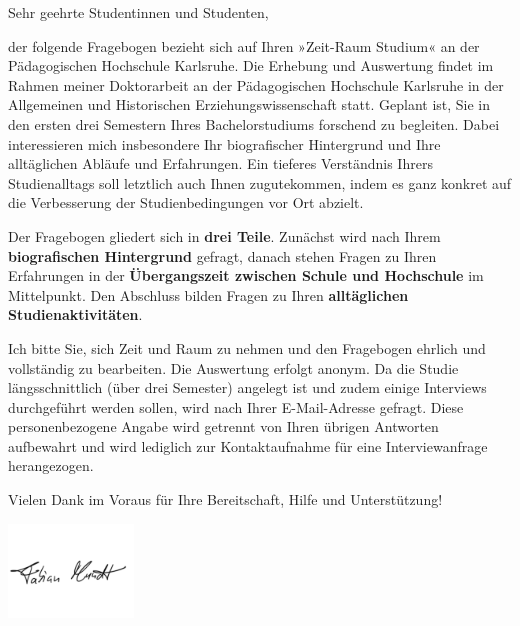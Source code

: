 

\begin{info}
\vspace{.5cm}

Sehr geehrte Studentinnen und Studenten,

\vspace{.5em}

der folgende Fragebogen bezieht sich auf Ihren »Zeit-Raum Studium« an der Pädagogischen Hochschule Karlsruhe. Die Erhebung und Auswertung findet im Rahmen meiner Doktorarbeit an der Pädagogischen Hochschule Karlsruhe in der Allgemeinen und Historischen Erziehungswissenschaft statt. Geplant ist, Sie in den ersten drei Semestern Ihres Bachelorstudiums forschend zu begleiten. Dabei interessieren mich insbesondere Ihr biografischer Hintergrund und Ihre alltäglichen Abläufe und Erfahrungen. Ein tieferes Verständnis Ihrers Studienalltags soll letztlich auch Ihnen zugutekommen, indem es ganz konkret auf die Verbesserung der Studienbedingungen vor Ort abzielt.

\vspace{.5em}

Der Fragebogen gliedert sich in \textbf{drei Teile}. Zunächst wird nach Ihrem \textbf{biografischen Hintergrund} gefragt, danach stehen Fragen zu Ihren Erfahrungen in der \textbf{Übergangszeit zwischen Schule und Hochschule} im Mittelpunkt. Den Abschluss bilden Fragen zu Ihren \textbf{alltäglichen Studienaktivitäten}.

\vspace{.5em}

Ich bitte Sie, sich Zeit und Raum zu nehmen und den Fragebogen ehrlich und vollständig zu bearbeiten. Die Auswertung erfolgt anonym. Da die Studie längsschnittlich (über drei Semester) angelegt ist und zudem einige Interviews durchgeführt werden sollen, wird nach Ihrer E-Mail-Adresse  gefragt. Diese personenbezogene Angabe wird getrennt von Ihren übrigen Antworten aufbewahrt und wird lediglich zur Kontaktaufnahme für eine Interviewanfrage herangezogen.

\vspace{.5em}

Vielen Dank im Voraus für Ihre Bereitschaft, Hilfe und Unterstützung!

\vspace{-1cm}

\includegraphics[width=0.25\textwidth]{unterschrift.png}

\vspace{-1.5cm}
\end{info}

